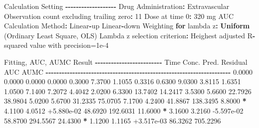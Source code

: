 \documentclass[
  10pt,
]{krantz}
\makeatletter
\newenvironment{Shaded}{\begin{snugshade}}{\end{snugshade}}
\newcommand{\ControlFlowTok}[1]{\textcolor[rgb]{0.13,0.29,0.53}{\textbf{#1}}}
\newcommand{\DecValTok}[1]{\textcolor[rgb]{0.00,0.00,0.81}{#1}}
\newcommand{\FloatTok}[1]{\textcolor[rgb]{0.00,0.00,0.81}{#1}}
\newcommand{\KeywordTok}[1]{\textcolor[rgb]{0.13,0.29,0.53}{\textbf{#1}}}
\newcommand{\NormalTok}[1]{#1}
\newcommand{\OperatorTok}[1]{\textcolor[rgb]{0.81,0.36,0.00}{\textbf{#1}}}
\newcommand{\StringTok}[1]{\textcolor[rgb]{0.31,0.60,0.02}{#1}}
\newenvironment{kframe}{%
\medskip{}
\setlength{\fboxsep}{.8em}
 \def\at@end@of@kframe{}%
 \ifinner\ifhmode%
  \def\at@end@of@kframe{\end{minipage}}%
  \begin{minipage}{\columnwidth}%
 \fi\fi%
 \def\FrameCommand##1{\hskip\@totalleftmargin \hskip-\fboxsep
 \colorbox{shadecolor}{##1}\hskip-\fboxsep
     \hskip-\linewidth \hskip-\@totalleftmargin \hskip\columnwidth}%
 \MakeFramed {\advance\hsize-\width
   \@totalleftmargin\z@ \linewidth\hsize
   \@setminipage}}%
 {\par\unskip\endMakeFramed%
 \at@end@of@kframe}
\renewenvironment{Shaded}{\begin{kframe}}{\end{kframe}}
\makeatother
\begin{document}
\begin{Shaded}
\begin{Highlighting}[]
\NormalTok{Calculation Setting}
\OperatorTok{{-}{-}{-}{-}{-}{-}{-}{-}{-}{-}{-}{-}{-}{-}{-}{-}{-}{-}{-}}
\NormalTok{Drug Administration}\OperatorTok{:}\StringTok{ }\NormalTok{Extravascular}
\NormalTok{Observation count excluding trailing zero}\OperatorTok{:}\StringTok{ }\DecValTok{11}
\NormalTok{Dose at time }\DecValTok{0}\OperatorTok{:}\StringTok{ }\DecValTok{320}\NormalTok{ mg}
\NormalTok{AUC Calculation Method}\OperatorTok{:}\StringTok{ }\NormalTok{Linear}\OperatorTok{{-}}\NormalTok{up Linear}\OperatorTok{{-}}\NormalTok{down}
\NormalTok{Weighting }\ControlFlowTok{for}\NormalTok{ lambda z}\OperatorTok{:}\StringTok{ }\KeywordTok{Uniform}\NormalTok{ (Ordinary Least Square, OLS)}
\NormalTok{Lambda z selection criterion}\OperatorTok{:}\StringTok{ }\NormalTok{Heighest adjusted R}\OperatorTok{{-}}\NormalTok{squared value with precision=}\FloatTok{1e{-}4}


\NormalTok{Fitting, AUC, AUMC Result}
\OperatorTok{{-}{-}{-}{-}{-}{-}{-}{-}{-}{-}{-}{-}{-}{-}{-}{-}{-}{-}{-}{-}{-}{-}{-}{-}{-}}
\StringTok{      }\NormalTok{Time         Conc.      Pred.   Residual       AUC       AUMC}
\OperatorTok{{-}{-}{-}{-}{-}{-}{-}{-}{-}{-}{-}{-}{-}{-}{-}{-}{-}{-}{-}{-}{-}{-}{-}{-}{-}{-}{-}{-}{-}{-}{-}{-}{-}{-}{-}{-}{-}{-}{-}{-}{-}{-}{-}{-}{-}{-}{-}{-}{-}{-}{-}{-}{-}{-}{-}{-}{-}{-}{-}{-}{-}{-}{-}{-}{-}{-}{-}{-}{-}}
\StringTok{     }\FloatTok{0.0000}       \FloatTok{0.0000}                           \FloatTok{0.0000}     \FloatTok{0.0000}
     \FloatTok{0.3000}       \FloatTok{7.3700}                           \FloatTok{1.1055}     \FloatTok{0.3316}
     \FloatTok{0.6300}       \FloatTok{9.0300}                           \FloatTok{3.8115}     \FloatTok{1.6351}
     \FloatTok{1.0500}       \FloatTok{7.1400}                           \FloatTok{7.2072}     \FloatTok{4.4042}
     \FloatTok{2.0200}       \FloatTok{6.3300}                          \FloatTok{13.7402}    \FloatTok{14.2417}
     \FloatTok{3.5300}       \FloatTok{5.6600}                          \FloatTok{22.7926}    \FloatTok{38.9804}
     \FloatTok{5.0200}       \FloatTok{5.6700}                          \FloatTok{31.2335}    \FloatTok{75.0705}
     \FloatTok{7.1700}       \FloatTok{4.2400}                          \FloatTok{41.8867}   \FloatTok{138.3495}
     \FloatTok{8.8000} \OperatorTok{*}\StringTok{     }\FloatTok{4.1100}     \FloatTok{4.0512} \FloatTok{+5.880e{-}02}    \FloatTok{48.6920}   \FloatTok{192.6031}
    \FloatTok{11.6000} \OperatorTok{*}\StringTok{     }\FloatTok{3.1600}     \FloatTok{3.2160} \FloatTok{{-}5.597e{-}02}    \FloatTok{58.8700}   \FloatTok{294.5567}
    \FloatTok{24.4300} \OperatorTok{*}\StringTok{     }\FloatTok{1.1200}     \FloatTok{1.1165} \FloatTok{+3.517e{-}03}    \FloatTok{86.3262}   \FloatTok{705.2296}


\end{Highlighting}
\end{Shaded}
\end{document}
